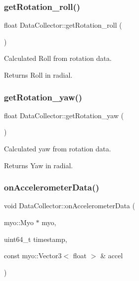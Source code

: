 \subsubsection{get\+Rotation\+\_\+roll()}
{\footnotesize\ttfamily float Data\+Collector\+::get\+Rotation\+\_\+roll (\begin{DoxyParamCaption}{ }\end{DoxyParamCaption})\hspace{0.3cm}{\ttfamily [inline]}}



Calculated Roll from rotation data. 

\begin{DoxyReturn}{Returns}
Roll in radial. 
\end{DoxyReturn}
\mbox{\label{class_data_collector_a45175c5352dd3870c2d1cf99c4b2d938}} 
\subsubsection{get\+Rotation\+\_\+yaw()}
{\footnotesize\ttfamily float Data\+Collector\+::get\+Rotation\+\_\+yaw (\begin{DoxyParamCaption}{ }\end{DoxyParamCaption})\hspace{0.3cm}{\ttfamily [inline]}}



Calculated yaw from rotation data. 

\begin{DoxyReturn}{Returns}
Yaw in radial. 
\end{DoxyReturn}
\mbox{\label{class_data_collector_af284c1bda701eb04d8278848672a1be6}} 
\subsubsection{on\+Accelerometer\+Data()}
{\footnotesize\ttfamily void Data\+Collector\+::on\+Accelerometer\+Data (\begin{DoxyParamCaption}\item[{myo\+::\+Myo $\ast$}]{myo,  }\item[{uint64\+\_\+t}]{timestamp,  }\item[{const myo\+::\+Vector3$<$ float $>$ \&}]{accel }\end{DoxyParamCaption})}

